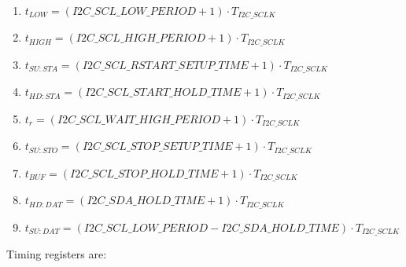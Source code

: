 \documentclass[main\_\_EN.tex]{subfiles}
\begin{document}
\begin{enumerate}
\item   $t_{LOW} = (\hyperref[fielddesc:I2CSCLLOWPERIOD]{I2C\_SCL\_LOW\_PERIOD} + 1) \cdot  T_{I2C\_SCLK}$

\item   $t_{HIGH} = (\hyperref[fielddesc:I2CSCLHIGHPERIOD]{I2C\_SCL\_HIGH\_PERIOD} + 1) \cdot  T_{I2C\_SCLK}$

\item   $t_{SU:STA} = (\hyperref[fielddesc:I2CSCLRSTARTSETUPTIME]{I2C\_SCL\_RSTART\_SETUP\_TIME} + 1) \cdot  T_{I2C\_SCLK}$

\item   $t_{HD:STA} = (\hyperref[fielddesc:I2CSCLSTARTHOLDTIME]{I2C\_SCL\_START\_HOLD\_TIME} +1) \cdot  T_{I2C\_SCLK}$

\item   $t_{r} = (\hyperref[fielddesc:I2CSCLWAITHIGHPERIOD]{I2C\_SCL\_WAIT\_HIGH\_PERIOD} + 1 ) \cdot  T_{I2C\_SCLK}$

\item   $t_{SU:STO} = (\hyperref[fielddesc:I2CSCLSTOPSETUPTIME]{I2C\_SCL\_STOP\_SETUP\_TIME}  + 1) \cdot  T_{I2C\_SCLK}$

\item   $t_{BUF} = (\hyperref[fielddesc:I2CSCLSTOPHOLDTIME]{I2C\_SCL\_STOP\_HOLD\_TIME}  + 1) \cdot  T_{I2C\_SCLK}$

\item   $t_{HD:DAT} = (\hyperref[fielddesc:I2CSDAHOLDTIME]{I2C\_SDA\_HOLD\_TIME} +1) \cdot  T_{I2C\_SCLK}$

\item   $t_{SU:DAT} = (\hyperref[fielddesc:I2CSCLLOWPERIOD]{I2C\_SCL\_LOW\_PERIOD} - \hyperref[fielddesc:I2CSDAHOLDTIME]{I2C\_SDA\_HOLD\_TIME}) \cdot  T_{I2C\_SCLK}$
\end{enumerate}

Timing registers are:
\end{document}
